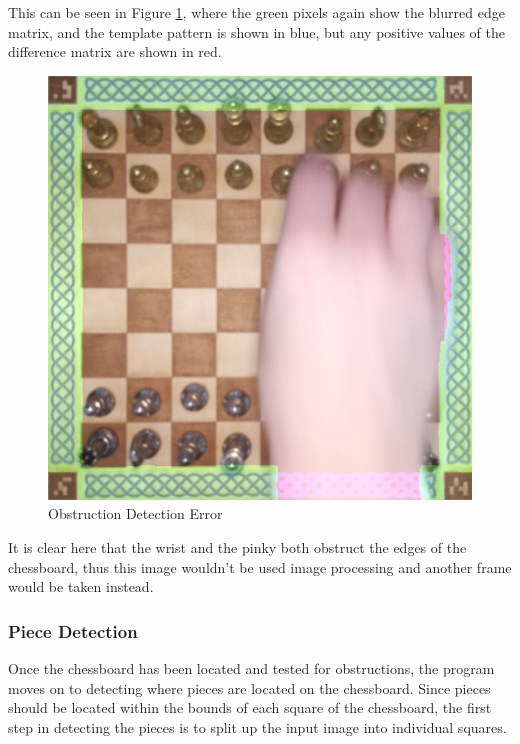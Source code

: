 \documentclass[journal]{IEEEtran}
\begin{document}
This can be seen in Figure \ref{knot error}, where the green pixels again show the blurred edge matrix, and the template pattern is shown in blue, but any positive values of the difference matrix are shown in red.

\begin{figure}[!ht]
	\centering
	\includegraphics[width=\linewidth]{Images/KnotDetectionError.jpg}
	\caption{Obstruction Detection Error}
	\label{knot error}
\end{figure}

It is clear here that the wrist and the pinky both obstruct the edges of the chessboard, thus this image wouldn't be used image processing and another frame would be taken instead.

\vspace{12pt}

\subsubsection{Piece Detection}
\label{PieceDetection}
Once the chessboard has been located and tested for obstructions, the program moves on to detecting where pieces are located on the chessboard.
Since pieces should be located within the bounds of each square of the chessboard, the first step in detecting the pieces is to split up the input image into individual squares.
\end{document}
